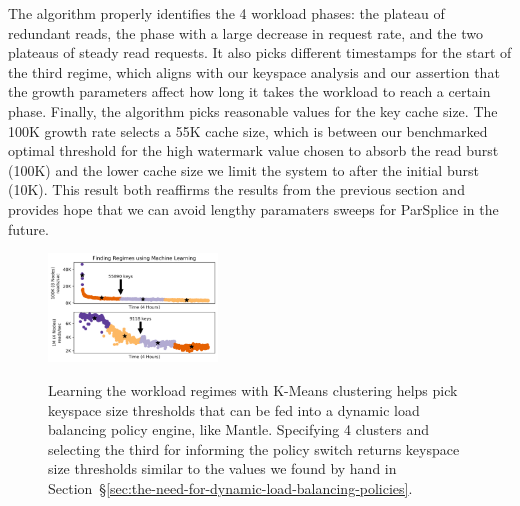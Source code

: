The algorithm properly identifies the 4 workload phases: the plateau of
redundant reads, the phase with a large decrease in request rate, and the two
plateaus of steady read requests. It also picks different timestamps for the
start of the third regime, which aligns with our keyspace analysis and our
assertion that the growth parameters affect how long it takes the workload to
reach a certain phase.  Finally, the algorithm picks reasonable values for the
key cache size. The 100K growth rate selects a 55K cache size, which is between
our benchmarked optimal threshold for the high watermark value chosen to
absorb the read burst (100K) and the lower cache size we limit the system to
after the initial burst (10K). This result both reaffirms the results from the
previous section and provides hope that we can avoid lengthy paramaters sweeps
for ParSplice in the future.

\begin{figure}[t]
\noindent\includegraphics[width=0.4\textwidth]{figures/futurework-regimes.png}\\
  \caption{Learning the workload regimes with K-Means clustering helps pick
  keyspace size thresholds that can be fed into a dynamic load balancing policy
  engine, like Mantle. Specifying 4 clusters and selecting the third for
  informing the policy switch returns keyspace size thresholds similar to the
  values we found by hand in
  Section~\S\ref{sec:the-need-for-dynamic-load-balancing-policies}.
\label{fig:futurework-regimes}}
\end{figure}
